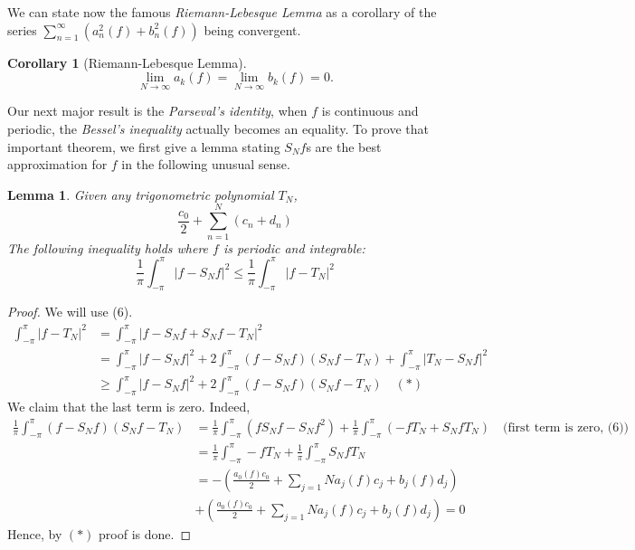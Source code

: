 \documentclass[12pt]{amsart}
\newtheorem{corollary}[theorem]{Corollary}
\newtheorem{lemma}[theorem]{Lemma}
\theoremstyle{definition}
\begin{document}
We can state now the famous \emph{Riemann-Lebesque Lemma} as a corollary of the series $\sum_{n=1}^{\infty} \left(a_n^2(f) + b_n^2(f)\right)$ being convergent.


\begin{corollary}[Riemann-Lebesque Lemma]
    \[
    \lim_{N \to \infty}a_k(f) = \lim_{N \to \infty}b_k(f) = 0.
    \]
\end{corollary}


Our next major result is the \textit{Parseval's identity}, when $f$ is continuous and periodic, the \textit{Bessel's inequality} actually becomes an equality. To prove that important theorem, we first give a lemma stating $S_Nf$s are the best approximation for $f$ in the following unusual sense\footnotemark{}.




\begin{lemma}
    Given any trigonometric polynomial $T_N$,
    \[
    \frac{c_0}{2} + \sum_{n=1}^{N} (c_n + d_n)
    \]
    The following inequality holds where $f$ is periodic and integrable:
    \[
    \frac{1}{\pi} \int_{-\pi}^{\pi}\left| f - S_Nf\right|^2 \leq \frac{1}{\pi} \int_{-\pi}^{\pi}\left| f - T_N\right|^2
    \]
\end{lemma}


\begin{proof}
    We will use (6).
    \[
    \begin{aligned}
        \int_{-\pi}^{\pi}\left| f - T_N\right|^2
        &= \int_{-\pi}^{\pi}\left| f - S_Nf + S_Nf - T_N\right|^2\\
        &=  \int_{-\pi}^{\pi} \left| f - S_Nf\right|^2
        + 2 \int_{-\pi}^{\pi}  (f - S_Nf)(S_Nf - T_N)
        + \int_{-\pi}^{\pi} \left| T_N - S_Nf\right|^2 \\
        &\geq \int_{-\pi}^{\pi} \left| f - S_Nf\right|^2
        + 2 \int_{-\pi}^{\pi}  (f - S_Nf)(S_Nf - T_N)  \quad(\ast)
    \end{aligned}
    \]
    We claim that the last term is zero. Indeed,
    \[
    \begin{aligned}
        \frac{1}{\pi}\int_{-\pi}^{\pi}  (f - S_Nf)(S_Nf - T_N)
        &= \frac{1}{\pi} \int_{-\pi}^{\pi}  (fS_Nf - S_Nf^2) + \frac{1}{\pi} \int_{-\pi}^{\pi} (-fT_N + S_NfT_N) \quad \text{(first term is zero, (6))}\\
        &= \frac{1}{\pi} \int_{-\pi}^{\pi} -fT_N + \frac{1}{\pi} \int_{-\pi}^{\pi}  S_NfT_N\\
        &= -\left( \frac{a_0(f)c_0}{2} + \sum_{j=1}{N}a_j(f)c_j + b_j(f)d_j\right) \\
        &+ \left( \frac{a_0(f)c_0}{2} + \sum_{j=1}{N}a_j(f)c_j + b_j(f)d_j\right) = 0
    \end{aligned}
    \]
    Hence, by $(\ast)$ proof is done.
\end{proof}
\end{document}
